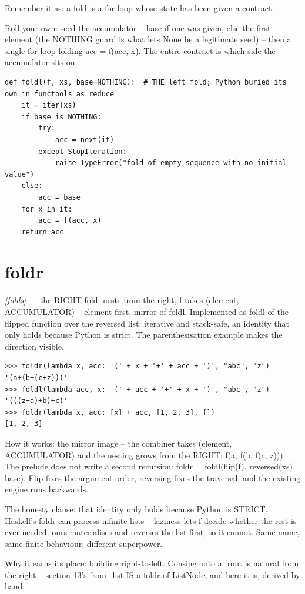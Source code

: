 \documentclass[11pt,letterpaper]{book}
\begin{document}
Remember it as: a fold is a for-loop whose state has been given a contract.


Roll your own: seed the accumulator -- base if one was given, else the first element (the NOTHING guard is what lets None be a legitimate seed) -- then a single for-loop folding acc = f(acc, x). The entire contract is which side the accumulator sits on.

\begin{lstlisting}[style=code]
def foldl(f, xs, base=NOTHING):  # THE left fold; Python buried its own in functools as reduce
    it = iter(xs)
    if base is NOTHING:
        try:
            acc = next(it)
        except StopIteration:
            raise TypeError("fold of empty sequence with no initial value")
    else:
        acc = base
    for x in it:
        acc = f(acc, x)
    return acc
\end{lstlisting}

\section{foldr}
\noindent\textit{[folds]} --- the RIGHT fold: nests from the right, f takes (element, ACCUMULATOR) -- element first, mirror of foldl. Implemented as foldl of the flipped function over the reversed list: iterative and stack-safe, an identity that only holds because Python is strict. The parenthesisation example makes the direction visible.
\begin{lstlisting}[style=spec]
>>> foldr(lambda x, acc: '(' + x + '+' + acc + ')', "abc", "z")
'(a+(b+(c+z)))'
>>> foldl(lambda acc, x: '(' + acc + '+' + x + ')', "abc", "z")
'(((z+a)+b)+c)'
>>> foldr(lambda x, acc: [x] + acc, [1, 2, 3], [])
[1, 2, 3]
\end{lstlisting}

How it works: the mirror image -- the combiner takes (element, ACCUMULATOR) and the nesting grows from the RIGHT: f(a, f(b, f(c, z))). The prelude does not write a second recursion: foldr = foldl(flip(f), reversed(xs), base). Flip fixes the argument order, reversing fixes the traversal, and the existing engine runs backwards.


The honesty clause: that identity only holds because Python is STRICT. Haskell's foldr can process infinite lists -- laziness lets f decide whether the rest is ever needed; ours materialises and reverses the list first, so it cannot. Same name, same finite behaviour, different superpower.


Why it earns its place: building right-to-left. Consing onto a front is natural from the right -- section 13's from\_list IS a foldr of ListNode, and here it is, derived by hand:
\end{document}
